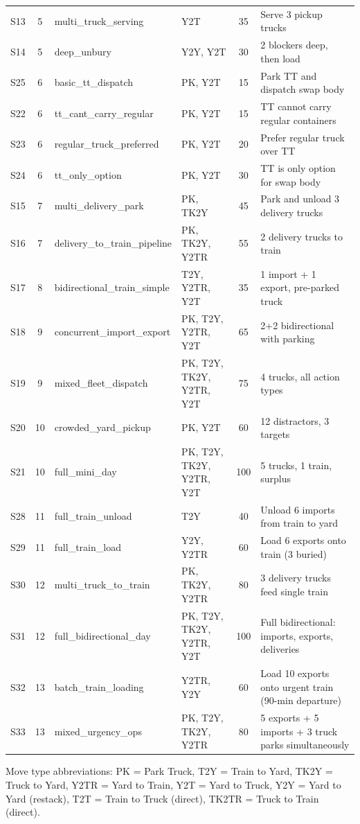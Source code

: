 \begin{table}[H]
\begin{tabularx}{\textwidth}{c c l l c X}
\midrule
S13 & 5 & multi\_truck\_serving   & Y2T       & 35 & Serve 3 pickup trucks \\
S14 & 5 & deep\_unbury            & Y2Y, Y2T  & 30 & 2 blockers deep, then load \\
\midrule
S25 & 6 & basic\_tt\_dispatch     & PK, Y2T   & 15 & Park TT and dispatch swap body \\
S22 & 6 & tt\_cant\_carry\_regular & PK, Y2T  & 15 & TT cannot carry regular containers \\
S23 & 6 & regular\_truck\_preferred & PK, Y2T & 20 & Prefer regular truck over TT \\
S24 & 6 & tt\_only\_option        & PK, Y2T   & 30 & TT is only option for swap body \\
\midrule
S15 & 7 & multi\_delivery\_park   & PK, TK2Y  & 45 & Park and unload 3 delivery trucks \\
S16 & 7 & delivery\_to\_train\_pipeline & PK, TK2Y, Y2TR & 55 & 2 delivery trucks to train \\
\midrule
S17 & 8 & bidirectional\_train\_simple & T2Y, Y2TR, Y2T & 35 & 1 import + 1 export, pre-parked truck \\
\midrule
S18 & 9 & concurrent\_import\_export & PK, T2Y, Y2TR, Y2T & 65 & 2+2 bidirectional with parking \\
S19 & 9 & mixed\_fleet\_dispatch  & PK, T2Y, TK2Y, Y2TR, Y2T & 75 & 4 trucks, all action types \\
\midrule
S20 & 10 & crowded\_yard\_pickup   & PK, Y2T   & 60 & 12 distractors, 3 targets \\
S21 & 10 & full\_mini\_day         & PK, T2Y, TK2Y, Y2TR, Y2T & 100 & 5 trucks, 1 train, surplus \\
\midrule
S28 & 11 & full\_train\_unload     & T2Y       & 40 & Unload 6 imports from train to yard \\
S29 & 11 & full\_train\_load       & Y2Y, Y2TR & 60 & Load 6 exports onto train (3 buried) \\
\midrule
S30 & 12 & multi\_truck\_to\_train & PK, TK2Y, Y2TR & 80 & 3 delivery trucks feed single train \\
S31 & 12 & full\_bidirectional\_day & PK, T2Y, TK2Y, Y2TR, Y2T & 100 & Full bidirectional: imports, exports, deliveries \\
\midrule
S32 & 13 & batch\_train\_loading   & Y2TR, Y2Y  & 60 & Load 10 exports onto urgent train (90-min departure) \\
S33 & 13 & mixed\_urgency\_ops     & PK, T2Y, TK2Y, Y2TR & 80 & 5 exports + 5 imports + 3 truck parks simultaneously \\
\bottomrule
\end{tabularx}

\vspace{0.5em}
\footnotesize
Move type abbreviations: PK = Park Truck, T2Y = Train to Yard, TK2Y = Truck to Yard,
Y2TR = Yard to Train, Y2T = Yard to Truck, Y2Y = Yard to Yard (restack),
T2T = Train to Truck (direct), TK2TR = Truck to Train (direct).
\end{table}
